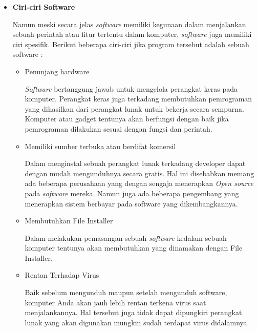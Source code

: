 \documentclass[12pt]{article}
\begin{document}
    \begin{itemize}
        
        \item \textbf{Ciri-ciri Software} 
        \par
        Namun meski secara jelas \textit{software} memiliki kegunaan dalam menjalankan sebuah perintah atau fitur tertentu dalam komputer, \textit{software} juga memiliki ciri spesifik. Berikut beberapa ciri-ciri jika program tersebut adalah sebuah software :
        \begin{itemize}
            \item Penunjang hardware
            \par
            \textit{Software} bertanggung jawab untuk mengelola perangkat keras pada komputer. Perangkat keras juga terkadang membutuhkan pemrograman yang dihasilkan dari perangkat lunak untuk bekerja secara sempurna. Komputer atau gadget tentunya akan berfungsi dengan baik jika pemrograman dilakukan sesuai dengan fungsi dan perintah.
            \item Memiliki sumber terbuka atau berdifat komersil
            \par
            Dalam menginstal sebuah perangkat lunak terkadang developer dapat dengan mudah mengunduhnya secara gratis. Hal ini disebabkan memang ada beberapa perusahaan yang dengan sengaja menerapkan \textit{Open source} pada \textit{software} mereka. Namun juga ada beberapa pengembang yang menerapkan sistem berbayar pada software yang dikembangkannya.
            \item Membutuhkan File Installer
            \par
            Dalam melakukan pemasangan sebuah \textit{software} kedalam sebuah komputer tentunya akan membutuhkan yang dinamakan dengan File Installer.
            \item Rentan Terhadap Virus
            \par
            Baik sebelum mengunduh maupun setelah mengunduh software, komputer Anda akan jauh lebih rentan terkena virus saat menjalankannya. Hal tersebut juga tidak dapat dipungkiri perangkat lunak yang akan digunakan mungkin sudah terdapat virus didalamnya.
        \end{itemize}


\end{itemize}
\end{document}
